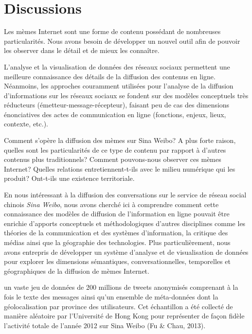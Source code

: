 \section[Discussions]{Discussions}

Les mèmes Internet sont une forme de contenu possédant de nombreuses particularités. 
Nous avons besoin de développer un nouvel outil afin de pouvoir les observer dans le détail et de mieux les connaître.

L{\textquoteright}analyse et la visualisation de données des réseaux  sociaux permettent une meilleure connaissance des détails de la  diffusion des contenus en ligne. Néanmoins, les approches couramment  utilisées pour l{\textquoteright}analyse de la diffusion  d{\textquoteright}informations sur les réseaux sociaux se fondent sur  des modèles conceptuels très réducteurs  (émetteur-message-récepteur), faisant peu de cas des dimensions  énonciatives des actes de communication en ligne (fonctions, enjeux,  lieux, contexte, etc.).


Comment s'opère la diffusion des mèmes sur Sina Weibo? A plus forte raison, quelles sont les particularités de ce type de contenu par rapport à d'autres contenus plus traditionnels? Comment pouvons-nous observer ces mèmes Internet? Quelles relations entretiennent-t-ils avec le milieu numérique qui les produit? Ont-t-ils une existence territoriale.

En nous intéressant à la diffusion des  conversations sur le service de réseau social chinois \textit{Sina  Weibo}, nous avons cherché ici à comprendre comment cette  connaissance des modèles de diffusion de  l{\textquoteright}information en ligne pouvait être enrichie  d{\textquoteright}apports conceptuels et méthodologiques  d{\textquoteright}autres disciplines comme les théories de la  communication et des systèmes d{\textquoteright}information, la  critique des médias ainsi que la géographie des technologies. Plus  particulièrement, nous avons entrepris de développer un système  d{\textquoteright}analyse et de visualisation de données pour  explorer les dimensions sémantiques, conversationnelles, temporelles  et géographiques de la diffusion de mèmes Internet.   

un vaste jeu de données de 200 millions de tweets anonymisés comprenant à la fois le texte des messages ainsi qu{\textquoteright}un ensemble de méta-données dont la géolocalisation par province des utilisateurs. Cet échantillon a été collecté de manière aléatoire par l{\textquoteright}Université de Hong Kong pour représenter de fa\c{c}on fidèle l{\textquoteright}activité totale de l{\textquoteright}année 2012 sur Sina Weibo (Fu \& Chau, 2013). 

